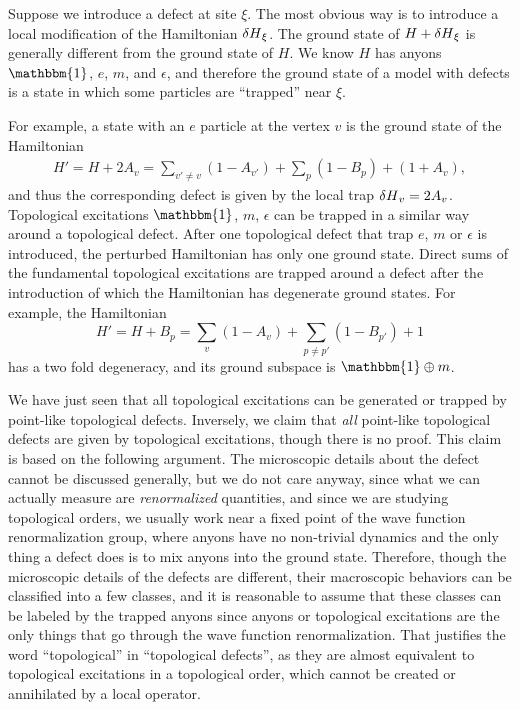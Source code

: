 \documentclass[hyperref, a4paper]{article}
\begin{document}
Suppose we introduce a defect at site $\xi$. The most obvious way is to introduce a local modification of the Hamiltonian $\var{H}_\xi$.
The ground state of $H+\var{H}_\xi$ is generally different from the ground state of $H$.
We know $H$ has anyons $\mathbbm{1}$, $e$, $m$, and $\epsilon$, and therefore the ground state of a model with defects is a state in which some particles are ``trapped'' near $\xi$.

For example, a state with an $e$ particle at the vertex $v$ is the ground state of the Hamiltonian
\begin{eqnarray}
    H' = H + 2 A_v = \sum_{v' \neq v} (1 - A_{v'}) + \sum_p (1 - B_p) + (1 + A_v),
\end{eqnarray}
and thus the corresponding defect is given by the local trap $\var{H}_v = 2 A_v$.
Topological excitations $\mathbbm{1}$, $m$, $\epsilon$ can be trapped in a similar way around a topological defect.
After one topological defect that trap $e$, $m$ or $\epsilon$ is introduced, the perturbed Hamiltonian has only one ground state.
Direct sums of the fundamental topological excitations are trapped around a defect after the introduction of which the Hamiltonian has degenerate ground states. 
For example, the Hamiltonian
\begin{equation}
    H' = H + B_p = \sum_v (1 - A_v) + \sum_{p \neq p'} (1 - B_{p'}) + 1
\end{equation}
has a two fold degeneracy, and its ground subspace is $\mathbbm{1} \oplus m$.

We have just seen that all topological excitations can be generated or trapped by point-like topological defects.
Inversely, we claim that \emph{all} point-like topological defects are given by topological excitations, though there is no proof.
This claim is based on the following argument.
The microscopic details about the defect cannot be discussed generally, but we do not care anyway, since what we can actually measure are \emph{renormalized} quantities, and since we are studying topological orders, we usually work near a fixed point of the wave function renormalization group, where anyons have no non-trivial dynamics and the only thing a defect does is to mix anyons into the ground state.
Therefore, though the microscopic details of the defects are different, their macroscopic behaviors can be classified into a few classes, and it is reasonable to assume that these classes can be labeled by the trapped anyons since anyons or topological excitations are the only things that go through the wave function renormalization. 
That justifies the word ``topological'' in ``topological defects'', as they are almost equivalent to topological excitations in a topological order, which cannot be created or annihilated by a local operator.
\end{document}
